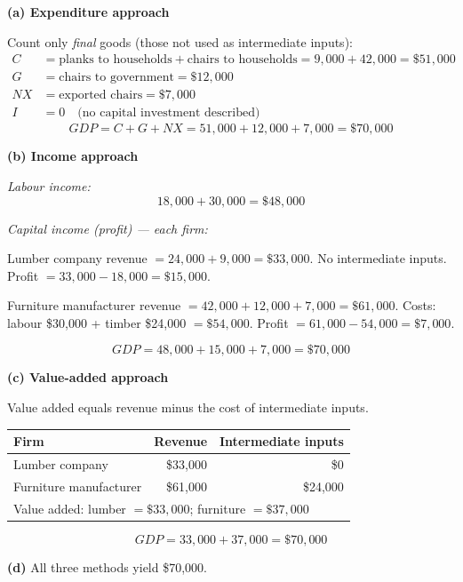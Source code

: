 \documentclass[12pt]{article}
\newenvironment{soln}{%
  \begin{tcolorbox}[
    breakable,
    colback=blue!4!white,
    colframe=blue!50!black,
    title={\textbf{Solution}},
    fonttitle=\small,
    left=4pt, right=4pt, top=4pt, bottom=4pt
  ]
}{%
  \end{tcolorbox}
}
\begin{document}
\begin{soln}
\textbf{(a) Expenditure approach}

Count only \emph{final} goods (those not used as intermediate inputs):
\begin{align*}
  C &= \text{planks to households} + \text{chairs to households}
       = 9{,}000 + 42{,}000 = \$51{,}000 \\
  G &= \text{chairs to government} = \$12{,}000 \\
  NX &= \text{exported chairs} = \$7{,}000 \\
  I &= 0 \quad \text{(no capital investment described)}
\end{align*}
\[
  \boxed{GDP = C + G + NX = 51{,}000 + 12{,}000 + 7{,}000 = \$70{,}000}
\]

\textbf{(b) Income approach}

\textit{Labour income:}
\[
  18{,}000 + 30{,}000 = \$48{,}000
\]

\textit{Capital income (profit) --- each firm:}

Lumber company revenue $= 24{,}000 + 9{,}000 = \$33{,}000$.
No intermediate inputs.
Profit $= 33{,}000 - 18{,}000 = \$15{,}000$.

Furniture manufacturer revenue $= 42{,}000 + 12{,}000 + 7{,}000 = \$61{,}000$.
Costs: labour \$30{,}000 + timber \$24{,}000 $= \$54{,}000$.
Profit $= 61{,}000 - 54{,}000 = \$7{,}000$.

\[
  GDP = 48{,}000 + 15{,}000 + 7{,}000 = \boxed{\$70{,}000}
\]

\textbf{(c) Value-added approach}

Value added equals revenue minus the cost of intermediate inputs.

\medskip
\begin{tabular}{lrr}
  \toprule
  Firm & Revenue & Intermediate inputs \\
  \midrule
  Lumber company & \$33{,}000 & \$0 \\
  Furniture manufacturer & \$61{,}000 & \$24{,}000 \\
  \midrule
  \multicolumn{3}{l}{Value added: lumber $= \$33{,}000$; furniture $= \$37{,}000$} \\
  \bottomrule
\end{tabular}

\[
  GDP = 33{,}000 + 37{,}000 = \boxed{\$70{,}000}
\]

\textbf{(d)} All three methods yield \$70{,}000. \checkmark
\end{soln}

\bigskip
\newpage
\end{document}
